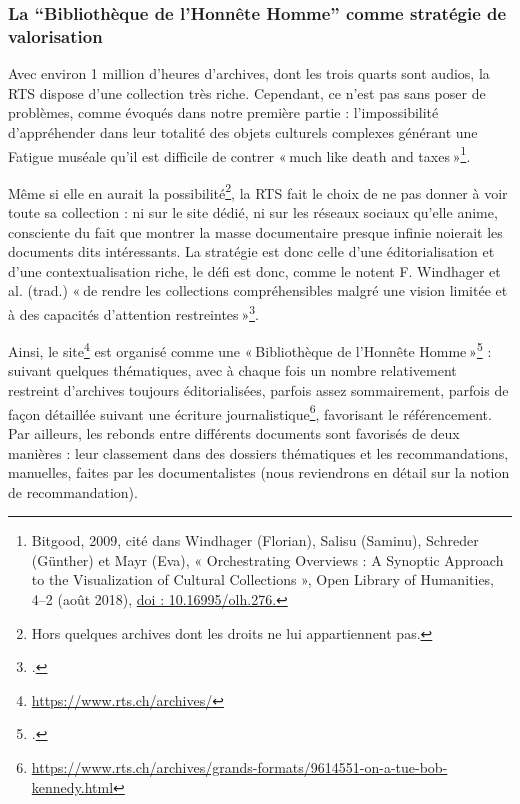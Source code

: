 \subsubsection{La \enquote{Bibliothèque de l'Honnête Homme} comme stratégie de valorisation }


Avec environ 1 million d’heures d’archives, dont les trois quarts sont audios, la RTS dispose d'une collection très riche. Cependant, ce n’est pas sans poser de problèmes, comme évoqués dans notre première partie : l’impossibilité d’appréhender dans leur totalité des objets culturels complexes générant une Fatigue muséale qu’il est difficile de contrer « much like death and taxes »\footnote{Bitgood, 2009, cité dans Windhager (Florian), Salisu (Saminu), Schreder (Günther) et Mayr (Eva), « Orchestrating Overviews : A Synoptic Approach to the Visualization of Cultural Collections », Open Library of Humanities, 4–2 (août 2018), \url{doi : 10.16995/olh.276.}}. 

Même si elle en aurait la possibilité\footnote{Hors quelques archives dont les droits ne lui appartiennent pas.}, la RTS fait le choix de ne pas donner à voir toute sa collection : ni sur le site dédié, ni sur les réseaux sociaux qu’elle anime, consciente du fait que montrer la masse documentaire presque infinie noierait les documents dits intéressants. La stratégie est donc celle d’une éditorialisation et d’une contextualisation riche, le défi est donc, comme le notent F. Windhager et al. (trad.) « de rendre les collections compréhensibles malgré une vision limitée et à des capacités d’attention restreintes »\footcite[p. 3]{windhager2018a}.

Ainsi, le site\footnote{\url{ https://www.rts.ch/archives/}} est organisé comme une « Bibliothèque de l’Honnête Homme »\footcite{chatelain2003} : suivant quelques thématiques, avec à chaque fois un nombre relativement restreint d’archives toujours éditorialisées, parfois assez sommairement, parfois de façon détaillée suivant une écriture journalistique\footnote{\url{https://www.rts.ch/archives/grands-formats/9614551-on-a-tue-bob-kennedy.html}}, favorisant le référencement. Par ailleurs, les rebonds entre différents documents sont favorisés de deux manières : leur classement dans des dossiers thématiques et les recommandations, manuelles, faites par les documentalistes (nous reviendrons en détail sur la notion de recommandation).


